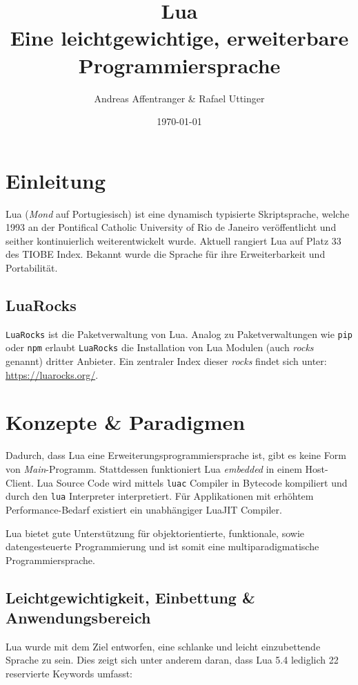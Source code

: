 \documentclass[11pt,a4paper]{article}
\title{Lua \\ [0.2em]\large Eine leichtgewichtige, erweiterbare Programmiersprache}
\author{Andreas Affentranger \& Rafael Uttinger}
\date{\today}
\begin{document}
\maketitle

\section*{Einleitung}

Lua (\textit{Mond} auf Portugiesisch) ist eine dynamisch typisierte Skriptsprache, welche 1993 an der Pontifical Catholic University of Rio de Janeiro veröffentlicht und seither kontinuierlich weiterentwickelt wurde. Aktuell rangiert Lua auf Platz 33 des TIOBE Index. Bekannt wurde die Sprache für ihre Erweiterbarkeit und Portabilität.

\subsection*{LuaRocks}

\texttt{LuaRocks} ist die Paketverwaltung von Lua.
Analog zu Paketverwaltungen wie \texttt{pip} oder \texttt{npm} erlaubt \texttt{LuaRocks} die Installation von Lua Modulen (auch \textit{rocks} genannt) dritter Anbieter.
Ein zentraler Index dieser \textit{rocks} findet sich unter: \url{https://luarocks.org/}.

\section*{Konzepte \& Paradigmen}

Dadurch, dass Lua eine Erweiterungsprogrammiersprache ist, gibt es keine Form von \textit{Main}-Programm. Stattdessen funktioniert Lua \textit{embedded} in einem Host-Client.
Lua Source Code wird mittels \texttt{luac} Compiler in Bytecode kompiliert und durch den \texttt{lua} Interpreter interpretiert. Für Applikationen mit erhöhtem Performance-Bedarf existiert ein unabhängiger LuaJIT Compiler.

Lua bietet gute Unterstützung für objektorientierte, funktionale, sowie datengesteuerte Programmierung und ist somit eine multiparadigmatische Programmiersprache.

\subsection*{Leichtgewichtigkeit, Einbettung \& Anwendungsbereich}

Lua wurde mit dem Ziel entworfen, eine schlanke und leicht einzubettende Sprache zu sein. Dies zeigt sich unter anderem daran, dass Lua 5.4 lediglich 22 reservierte Keywords umfasst:
\end{document}
